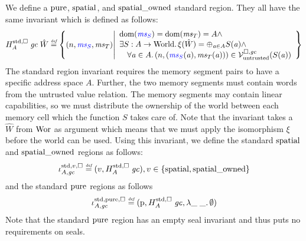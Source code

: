 \begin{jversion}
We define a $\pure$, $\spatial$, and $\spatialo$ standard region. They all have the same invariant which is defined as follows:
\[
  H_A^{\mathrm{std},\square} \; \gc \; \hat{W} \defeq \left\{ \npair{\src{\ms_S},\ms_T} \middle|
    \begin{array}{l}
      \dom(\src{\ms_S}) = \dom(\ms_T) = A \wedge \\
      \exists S : A \fun \World \ldotp \xi(\hat{W}) = \oplus_{\aaddr \in A} S(\aaddr) \wedge\\ 
      \quad \forall \aaddr \in A \ldotp \npair{(\src{\ms_S}(\aaddr),\ms_T(\aaddr))} \in \lrv(S(\aaddr))
    \end{array}
  \right\}
\]
The standard region invariant requires the memory segment pairs to have a specific address space $A$.
Further, the two memory segments must contain words from the untrusted value relation.
The memory segments may contain linear capabilities, so we must distribute the ownership of the world between each memory cell which the function $S$ takes care of.
Note that the invariant takes a $\hat{W}$ from $\Wor$ as argument which means that we must apply the isomorphism $\xi$ before the world can be used.
Using this invariant, we define the standard $\spatial$ and $\spatialo$ regions as follows:
\[
  \stdreg{A,\gc}{v} \defeq (v,H_A^{\mathrm{std},\square} \; \gc) , v \in \{\spatial,\spatialo\}
\]
and the standard $\pure$ regions as follows
\[
  \stdreg{A,\gc}{\pure} \defeq (\pur,H_A^{\mathrm{std},\square} \; \gc, \lambda \_ \; \_ \ldotp \emptyset)
\]
Note that the standard $\pure$ region has an empty seal invariant and thus puts no requirements on seals.


\end{jversion}
